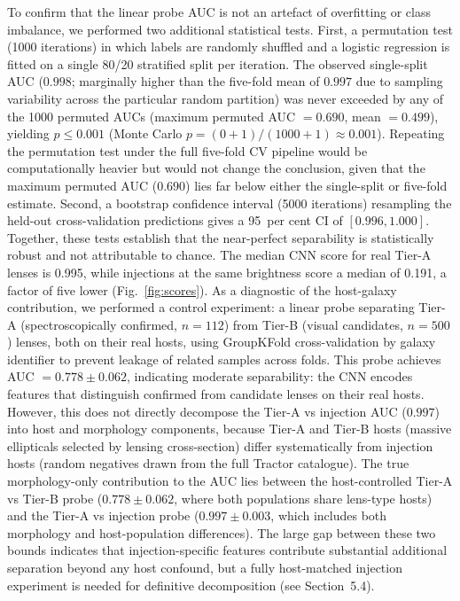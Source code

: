 \documentclass[fleqn,usenatbib]{rasti}
\begin{document}
To confirm that the linear probe AUC is not an artefact of overfitting or class imbalance, we performed two additional statistical tests.  First, a permutation test (1000 iterations) in which labels are randomly shuffled and a logistic regression is fitted on a single 80/20 stratified split per iteration.  The observed single-split AUC ($0.998$; marginally higher than the five-fold mean of $0.997$ due to sampling variability across the particular random partition) was never exceeded by any of the 1000 permuted AUCs (maximum permuted AUC $= 0.690$, mean $= 0.499$), yielding $p \leq 0.001$ (Monte Carlo $p = (0+1)/(1000+1) \approx 0.001$).  Repeating the permutation test under the full five-fold CV pipeline would be computationally heavier but would not change the conclusion, given that the maximum permuted AUC ($0.690$) lies far below either the single-split or five-fold estimate.  Second, a bootstrap confidence interval (5000 iterations) resampling the held-out cross-validation predictions gives a 95~per cent CI of $[0.996, 1.000]$.  Together, these tests establish that the near-perfect separability is statistically robust and not attributable to chance.  The median CNN score for real Tier-A lenses is 0.995, while injections at the same brightness score a median of 0.191, a factor of five lower (Fig.~\ref{fig:scores}).  As a diagnostic of the host-galaxy contribution, we performed a control experiment: a linear probe separating Tier-A (spectroscopically confirmed, $n = 112$) from Tier-B (visual candidates, $n = 500$) lenses, both on their real hosts, using GroupKFold cross-validation by galaxy identifier to prevent leakage of related samples across folds.  This probe achieves AUC $= 0.778 \pm 0.062$, indicating moderate separability: the CNN encodes features that distinguish confirmed from candidate lenses on their real hosts.  However, this does not directly decompose the Tier-A vs injection AUC ($0.997$) into host and morphology components, because Tier-A and Tier-B hosts (massive ellipticals selected by lensing cross-section) differ systematically from injection hosts (random negatives drawn from the full Tractor catalogue).  The true morphology-only contribution to the AUC lies between the host-controlled Tier-A vs Tier-B probe ($0.778 \pm 0.062$, where both populations share lens-type hosts) and the Tier-A vs injection probe ($0.997 \pm 0.003$, which includes both morphology and host-population differences).  The large gap between these two bounds indicates that injection-specific features contribute substantial additional separation beyond any host confound, but a fully host-matched injection experiment is needed for definitive decomposition (see Section~5.4).
\end{document}

